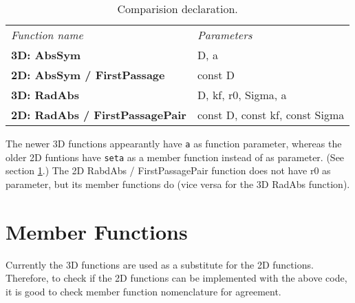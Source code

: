 \documentclass[a4paper,10pt]{article}
\begin{document}
\begin{table}[h!]
\caption{Comparision declaration.}
\label{table:declcomp}
\begin{tabular}{ p{} p{} }
  \textit{Function name} & \textit{Parameters} \\
  \textbf{3D: AbsSym} & D, a \\
  \textbf{2D: AbsSym / FirstPassage}  & const D \\
  \textbf{3D: RadAbs} &  D, kf, r0, Sigma, a \\
  \textbf{2D: RadAbs / FirstPassagePair} & const D, const kf, const Sigma \\
\end{tabular}
\end{table}

The newer 3D functions appearantly have \verb|a| as function parameter, whereas the older 2D funtions have \verb|seta| as a member function instead of as parameter. (See section \ref{Memberfunctions}.) The 2D RabdAbs / FirstPassagePair function does not have r0 as parameter, but its member functions do (vice versa for the 3D RadAbs function).

\section{Member Functions}
\label{Memberfunctions}

Currently the 3D functions are used as a substitute for the 2D functions. Therefore, to check if the 2D functions can be implemented with the above code, it is good to check member function nomenclature for agreement.
\end{document}
